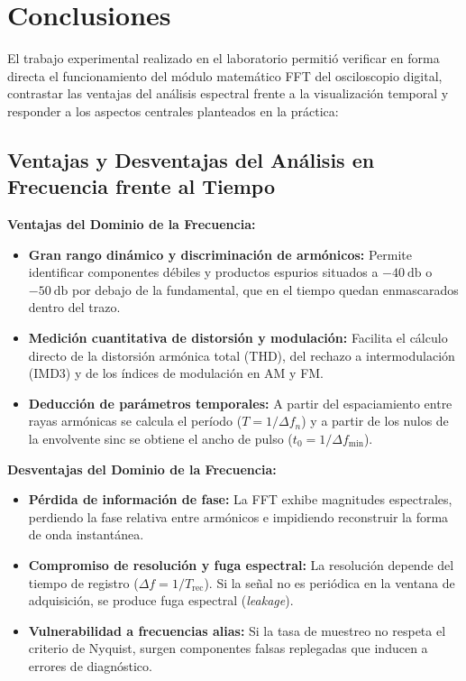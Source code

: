 \chapter{Conclusiones}

El trabajo experimental realizado en el laboratorio permitió verificar en forma directa el funcionamiento del módulo
matemático FFT del osciloscopio digital, contrastar las ventajas del análisis espectral frente a la visualización
temporal y responder a los aspectos centrales planteados en la práctica:

\section{Ventajas y Desventajas del Análisis en Frecuencia frente al Tiempo}

\noindent\textbf{Ventajas del Dominio de la Frecuencia:}
\begin{itemize}[noitemsep, topsep=2pt]
    \item \textbf{Gran rango dinámico y discriminación de armónicos:} Permite identificar componentes débiles y
    productos espurios situados a $\qty{-40}{\decibel}$ o $\qty{-50}{\decibel}$ por debajo de la fundamental, que
    en el tiempo quedan enmascarados dentro del trazo.
    \item \textbf{Medición cuantitativa de distorsión y modulación:} Facilita el cálculo directo de la distorsión
    armónica total (THD), del rechazo a intermodulación (IMD3) y de los índices de modulación en AM y FM.
    \item \textbf{Deducción de parámetros temporales:} A partir del espaciamiento entre rayas armónicas se calcula el
    período ($T = 1/\Delta f_n$) y a partir de los nulos de la envolvente sinc se obtiene el ancho de pulso
    ($t_0 = 1/\Delta f_{\text{min}}$).
\end{itemize}

\noindent\textbf{Desventajas del Dominio de la Frecuencia:}
\begin{itemize}[noitemsep, topsep=2pt]
    \item \textbf{Pérdida de información de fase:} La FFT exhibe magnitudes espectrales, perdiendo la fase relativa
    entre armónicos e impidiendo reconstruir la forma de onda instantánea.
    \item \textbf{Compromiso de resolución y fuga espectral:} La resolución depende del tiempo de registro ($\Delta f = 1/T_{\text{rec}}$).
    Si la señal no es periódica en la ventana de adquisición, se produce fuga espectral (\emph{leakage}).
    \item \textbf{Vulnerabilidad a frecuencias alias:} Si la tasa de muestreo no respeta el criterio de Nyquist,
    surgen componentes falsas replegadas que inducen a errores de diagnóstico.
\end{itemize}

